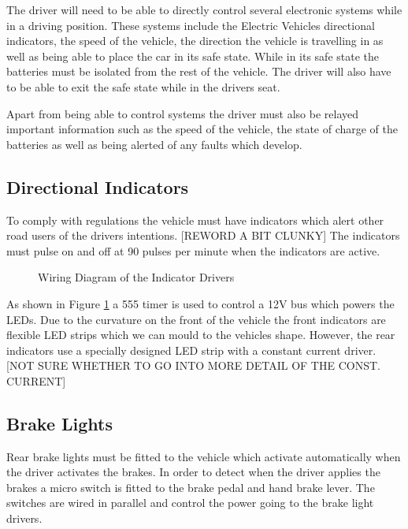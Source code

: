 The driver will need to be able to directly control several electronic systems while in a driving position. These systems include the Electric Vehicles directional indicators, the speed of the vehicle, the direction the vehicle is travelling in as well as being able to place the car in its safe state. While in its safe state the batteries must be isolated from the rest of the vehicle. The driver will also have to be able to exit the safe state while in the drivers seat. 

Apart from being able to control systems the driver must also be relayed important information such as the speed of the vehicle, the state of charge of the batteries as well as being alerted of any faults which develop.

\subsection{Directional Indicators}

To comply with regulations the vehicle must have indicators which alert other road users of the drivers intentions. [REWORD A BIT CLUNKY] The indicators must pulse on and off at 90 pulses per minute when the indicators are active. 

\begin{figure}[H]
\begin{center}


\caption{Wiring Diagram of the Indicator Drivers}
\label{Fig:IndicatorWiring}
\end{center}
\end{figure}

As shown in Figure \ref{Fig:IndicatorWiring} a 555 timer is used to control a 12V bus which powers the LEDs. Due to the curvature on the front of the vehicle the front indicators are flexible LED strips which we can mould to the vehicles shape. However, the rear indicators use a specially designed LED strip with a constant current driver. [NOT SURE WHETHER TO GO INTO MORE DETAIL OF THE CONST. CURRENT]

\subsection{Brake Lights}

Rear brake lights must be fitted to the vehicle which activate automatically when the driver activates the brakes. In order to detect when the driver applies the brakes a micro switch is fitted to the brake pedal and hand brake lever. The switches are wired in parallel and control the power going to the brake light drivers. 

